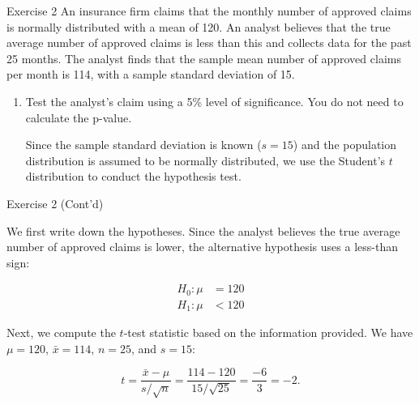\documentclass[
  ignorenonframetext,
  aspectratio=43,
]{beamer}
\let\olditem\item
\renewcommand\item{\olditem\justifying}
\begin{document}
\begin{frame}{Exercise 2}
\protect\hypertarget{exercise-2}{}
An insurance firm claims that the monthly number of approved claims is
normally distributed with a mean of 120. An analyst believes that the
true average number of approved claims is less than this and collects
data for the past 25 months. The analyst finds that the sample mean
number of approved claims per month is 114, with a sample standard
deviation of 15.

\begin{enumerate}
\item
  Test the analyst's claim using a 5\% level of significance. You do not
  need to calculate the p-value.

  \pause

  Since the sample standard deviation is known (\(s = 15\)) and the
  population distribution is assumed to be normally distributed, we use
  the Student's \(t\) distribution to conduct the hypothesis test.
\end{enumerate}
\end{frame}

\begin{frame}{Exercise 2 (Cont'd)}
\protect\hypertarget{exercise-2-contd}{}
\pause

We first write down the hypotheses. Since the analyst believes the true
average number of approved claims is lower, the alternative hypothesis
uses a less-than sign:\vspace{-4pt}

\pause

\[
\begin{aligned}
H_0: \mu &= 120 \\
H_1: \mu &< 120
\end{aligned}
\]

\pause

Next, we compute the \(t\)-test statistic based on the information
provided. We have \(\mu = 120\), \(\bar{x} = 114\), \(n = 25\), and
\(s = 15\):

\pause

\[
t = \frac{\bar{x} - \mu}{s / \sqrt{n}}
= \frac{114 - 120}{15 / \sqrt{25}}
= \frac{-6}{3}
= -2.
\]
\end{frame}
\end{document}
